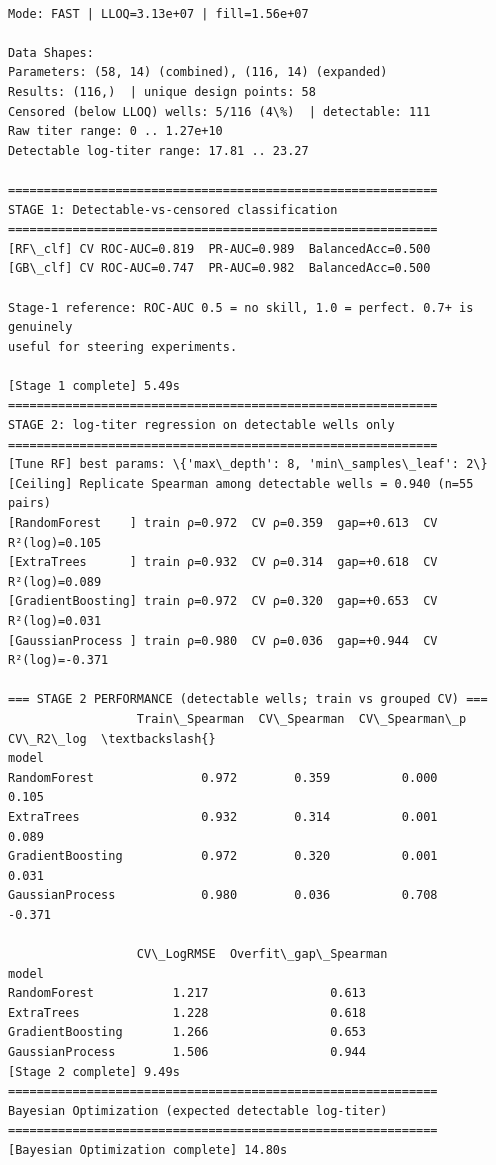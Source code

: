 \documentclass[11pt]{article}
\begin{document}
    \begin{Verbatim}[commandchars=\\\{\}]

Mode: FAST | LLOQ=3.13e+07 | fill=1.56e+07

Data Shapes:
Parameters: (58, 14) (combined), (116, 14) (expanded)
Results: (116,)  | unique design points: 58
Censored (below LLOQ) wells: 5/116 (4\%)  | detectable: 111
Raw titer range: 0 .. 1.27e+10
Detectable log-titer range: 17.81 .. 23.27

============================================================
STAGE 1: Detectable-vs-censored classification
============================================================
[RF\_clf] CV ROC-AUC=0.819  PR-AUC=0.989  BalancedAcc=0.500
[GB\_clf] CV ROC-AUC=0.747  PR-AUC=0.982  BalancedAcc=0.500

Stage-1 reference: ROC-AUC 0.5 = no skill, 1.0 = perfect. 0.7+ is genuinely
useful for steering experiments.

[Stage 1 complete] 5.49s
============================================================
STAGE 2: log-titer regression on detectable wells only
============================================================
[Tune RF] best params: \{'max\_depth': 8, 'min\_samples\_leaf': 2\}
[Ceiling] Replicate Spearman among detectable wells = 0.940 (n=55 pairs)
[RandomForest    ] train ρ=0.972  CV ρ=0.359  gap=+0.613  CV R²(log)=0.105
[ExtraTrees      ] train ρ=0.932  CV ρ=0.314  gap=+0.618  CV R²(log)=0.089
[GradientBoosting] train ρ=0.972  CV ρ=0.320  gap=+0.653  CV R²(log)=0.031
[GaussianProcess ] train ρ=0.980  CV ρ=0.036  gap=+0.944  CV R²(log)=-0.371

=== STAGE 2 PERFORMANCE (detectable wells; train vs grouped CV) ===
                  Train\_Spearman  CV\_Spearman  CV\_Spearman\_p  CV\_R2\_log  \textbackslash{}
model
RandomForest               0.972        0.359          0.000      0.105
ExtraTrees                 0.932        0.314          0.001      0.089
GradientBoosting           0.972        0.320          0.001      0.031
GaussianProcess            0.980        0.036          0.708     -0.371

                  CV\_LogRMSE  Overfit\_gap\_Spearman
model
RandomForest           1.217                 0.613
ExtraTrees             1.228                 0.618
GradientBoosting       1.266                 0.653
GaussianProcess        1.506                 0.944
[Stage 2 complete] 9.49s
============================================================
Bayesian Optimization (expected detectable log-titer)
============================================================
[Bayesian Optimization complete] 14.80s


\end{Verbatim}
\end{document}
